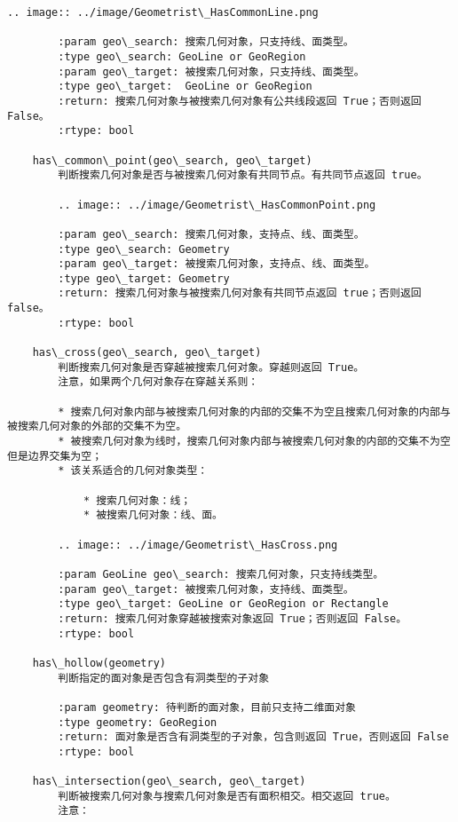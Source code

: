 \documentclass[11pt]{article}
\begin{document}
\begin{Verbatim}[commandchars=\\\{\}]
        .. image:: ../image/Geometrist\_HasCommonLine.png
        
        :param geo\_search: 搜索几何对象，只支持线、面类型。
        :type geo\_search: GeoLine or GeoRegion
        :param geo\_target: 被搜索几何对象，只支持线、面类型。
        :type geo\_target:  GeoLine or GeoRegion
        :return: 搜索几何对象与被搜索几何对象有公共线段返回 True；否则返回 False。
        :rtype: bool
    
    has\_common\_point(geo\_search, geo\_target)
        判断搜索几何对象是否与被搜索几何对象有共同节点。有共同节点返回 true。
        
        .. image:: ../image/Geometrist\_HasCommonPoint.png
        
        :param geo\_search: 搜索几何对象，支持点、线、面类型。
        :type geo\_search: Geometry
        :param geo\_target: 被搜索几何对象，支持点、线、面类型。
        :type geo\_target: Geometry
        :return: 搜索几何对象与被搜索几何对象有共同节点返回 true；否则返回 false。
        :rtype: bool
    
    has\_cross(geo\_search, geo\_target)
        判断搜索几何对象是否穿越被搜索几何对象。穿越则返回 True。
        注意，如果两个几何对象存在穿越关系则：
        
        * 搜索几何对象内部与被搜索几何对象的内部的交集不为空且搜索几何对象的内部与被搜索几何对象的外部的交集不为空。
        * 被搜索几何对象为线时，搜索几何对象内部与被搜索几何对象的内部的交集不为空但是边界交集为空；
        * 该关系适合的几何对象类型：
        
            * 搜索几何对象：线；
            * 被搜索几何对象：线、面。
        
        .. image:: ../image/Geometrist\_HasCross.png
        
        :param GeoLine geo\_search: 搜索几何对象，只支持线类型。
        :param geo\_target: 被搜索几何对象，支持线、面类型。
        :type geo\_target: GeoLine or GeoRegion or Rectangle
        :return: 搜索几何对象穿越被搜索对象返回 True；否则返回 False。
        :rtype: bool
    
    has\_hollow(geometry)
        判断指定的面对象是否包含有洞类型的子对象
        
        :param geometry: 待判断的面对象，目前只支持二维面对象
        :type geometry: GeoRegion
        :return: 面对象是否含有洞类型的子对象，包含则返回 True，否则返回 False
        :rtype: bool
    
    has\_intersection(geo\_search, geo\_target)
        判断被搜索几何对象与搜索几何对象是否有面积相交。相交返回 true。
        注意：
        

\end{Verbatim}
\end{document}

